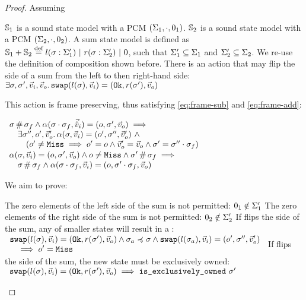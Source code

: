 \begin{proof}


Assuming 
\begin{hypvlist}
 $\mathbb S_1$ is a sound state model with a PCM $(\Sigma_1, \cdot, 0_1)$.
 $\mathbb S_2$ is a sound state model with a PCM $(\Sigma_2, \cdot, 0_2)$.
 A sum state model is defined as $\mathbb S_1 + \mathbb S_2 \stackrel{\textnormal{def}}= l(\sigma: \Sigma_1') ~|~ r(\sigma:\Sigma_2') ~|~ 0$, such that $\Sigma_1'\subseteq \Sigma_1$ and $\Sigma_2'\subseteq \Sigma_2$. We re-use the definition of composition shown before.
 There is an action \swap{} that may flip the side of a sum from the left to then right-hand side: $\exists\sigma,\sigma',\vec{v}_i,\vec{v}_o\ldotp \texttt{swap}(l(\sigma),\vec{v}_i)=(\texttt{Ok},r(\sigma'),\vec{v}_o)$
\end{hypvlist}

This \swap{} action is frame preserving, thus satisfying \ref{eq:frame-sub} and \ref{eq:frame-add}:
\begin{hypvlist}
	 $\begin{array}{l}
\sigma\operatorname{\#}\sigma_f \land \alpha(\sigma\cdot\sigma_f,\vec{\hat{v}}_i)=(o, \sigma',\vec{v}_o) \implies \\
\quad\exists \sigma'', o', \vec{v}_o'\ldotp \alpha(\sigma,\vec{v}_i)=(o', \sigma'', \vec{v}_o') ~\land \\
\qquad(o' \neq \texttt{Miss} \implies o' = o \land  \vec{v}_o' = \vec{v}_o \land \sigma' = \sigma'' \cdot \sigma_f)
	\end{array}$
	 $\begin{array}{l}
\alpha(\sigma,\vec{v}_i)=(o, \sigma', \vec{v}_o) \land o \neq \texttt{Miss} \land \sigma'\operatorname{\#}\sigma_f\implies\\
\quad\sigma \operatorname{\#} \sigma_f \land \alpha(\sigma\cdot\sigma_f, \vec{v}_i)=(o, \sigma'\cdot\sigma_f, \vec{v}_o)
	\end{array}$
\end{hypvlist}
	
We aim to prove:
\begin{goalvlist}
     The zero elements of the left side of the sum is not permitted: $0_1\notin \Sigma_1'$ 
     The zero elements of the right side of the sum is not permitted: $0_2\notin \Sigma_2'$ 
     If \swap{} flips the side of the sum, any \swap{} of smaller states will result in a \Miss: \\
    $\begin{array}{l}
    	\texttt{swap}(l(\sigma),\vec{v}_i)=(\texttt{Ok},r(\sigma'),\vec{v}_o)\land \sigma_a \preccurlyeq \sigma \land \texttt{swap}(l(\sigma_a),\vec{v}_i)=(o',\sigma'',\vec{v}_o') \\
    	\quad\implies o' = \texttt{Miss}
    \end{array}$
     If \swap{} flips the side of the sum, the new state must be exclusively owned:\\
    $\begin{array}{l}
    	\texttt{swap}(l(\sigma),\vec{v}_i)=(\texttt{Ok},r(\sigma'),\vec{v}_o) \implies \texttt{is\_exclusively\_owned}~\sigma'  
    \end{array}$
    

\end{goalvlist}
\end{proof}
